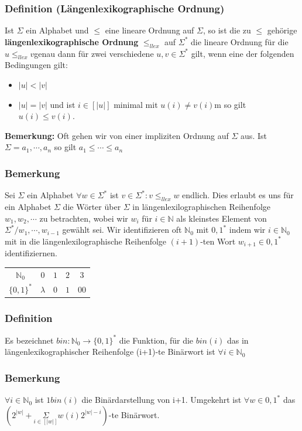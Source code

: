 \documentclass[a4paper,11pt]{article}
\begin{document}
\subsubsection{Definition (Längenlexikographische Ordnung)} Ist $\Sigma$ ein Alphabet und $\leq $ eine lineare Ordnung auf $\Sigma$, so ist die zu $\leq $ gehörige \textbf{längenlexikographische Ordnung} $\leq_{llex}$ auf $\Sigma^{*}$ die lineare Ordnung für die $u \leq_{llex} v $genau dann für zwei verschiedene $u, v\in \Sigma^{*}$ gilt, wenn eine der folgenden Bedingungen gilt:
\begin{itemize}
    \item $\lvert u \rvert < \lvert v \rvert$
    \item $\lvert u \rvert = \lvert v \rvert$ und ist $i \in [|u|]$ minimal mit 
    $u(i) \neq v(i)$m so gilt $u(i) \leq v(i)$.
\end{itemize}
\textbf{Bemerkung: }Oft gehen wir von einer impliziten Ordnung auf $\Sigma$ aus. Ist $\Sigma = {a_{1}, \cdots, a_{n}}$ so gilt $a_{1}\leq \cdots \leq a_{n}$

\subsubsection{Bemerkung} Sei $\Sigma$ ein Alphabet $\forall w \in \Sigma^{*}$ ist ${v\in \Sigma^{*} : v \leq_{llex}w}$ endlich. Dies erlaubt es uns für ein Alphabet $\Sigma$ die Wörter über $\Sigma$ in längenlexilographischen Reihenfolge $w_{1}, w_{2}, \cdots$ zu betrachten, wobei wir $w_{i}$ für $i \in \mathbb{N}$ als kleinstes Element von $\Sigma^{*}/{w_{1},\cdots, w_{i-1}}$ gewählt sei. Wir identifizieren oft $\mathbb{N}_{0}$ mit ${0, 1}^{*}$ indem wir $i \in \mathbb{N}_{0}$ mit in die längenlexilographische Reihenfolge $(i+1)$-ten Wort $w_{i+1} \in {0,1}^{*}$ identifiziernen.
\begin{center}
    \begin{tabular}{ c c c c c }
        $\mathbb{N}_{0}$ & $0$ & $1$ & $2$ & $3$\\ 
        $\{0, 1\}^{*}$ & $\lambda$ & $0$ & $1$ & $00$\\   
    \end{tabular}
\end{center}

\subsubsection{Definition} Es bezeichnet $bin : \mathbb{N}_{0} \rightarrow \{0, 1\}^{*}$ die Funktion, für die $bin(i)$ das in längenlexikographischer Reihenfolge (i+1)-te Binärwort ist $\forall i \in \mathbb{N}_{0}$

\subsubsection{Bemerkung}
$\forall i \in \mathbb{N}_{0}$ ist $1 bin(i)$ die Binärdarstellung von i+1. Umgekehrt ist $\forall w \in {0, 1}^{*}$ das $(2^{|w|} + \underset{i \in [|w|]}{\Sigma} w(i) 2^{|w|-i})$-te Binärwort.
\end{document}
